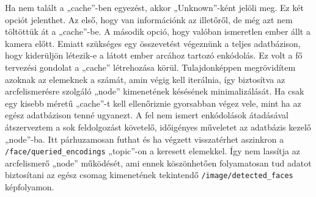 Ha nem talált a „cache”-ben egyezést, akkor „Unknown”-ként jelöli meg. Ez két opciót jelenthet. Az első, hogy van információnk az illetőről, de még azt nem töltöttük át a „cache”-be. A második opció, hogy valóban ismeretlen ember állt a kamera előtt. Emiatt szükséges egy összevetést végeznünk a teljes adatbázison, hogy kiderüljön létezik-e a látott ember arcához tartozó enkódolás.
Ez volt a fő tervezési gondolat a „cache” létrehozása körül. Tulajdonképpen megrövidítem azoknak az elemeknek a számát, amin végig kell iterálnia, így biztosítva az arcfelismerésre szolgáló „node” kimenetének késésének minimalizálását. Ha csak egy kisebb méretű „cache”-t kell ellenőriznie gyorsabban végez vele, mint ha az egész adatbázison tenné ugyanezt. A fel nem ismert enkódolások átadásával átszerveztem a sok feldolgozást követelő, időigényes műveletet az adatbázis kezelő „node”-ba. Itt párhuzamosan futhat és ha végzett visszatérhet aszinkron a \verb|/face/queried_encodings| „topic”-on a keresett elemekkel. Így nem lassítja az arcfelismerő „node” működését, ami ennek köszönhetően folyamatosan tud adatot biztosítani az egész csomag kimenetének tekintendő \verb|/image/detected_faces| képfolyamon.

